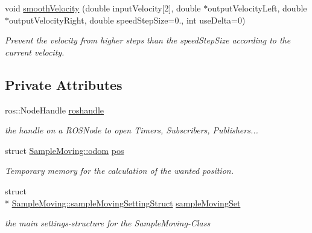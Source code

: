 \begin{DoxyCompactItemize}
void \hyperlink{classSampleMoving_ac7ba11bc1bd16a55bc217079d2f5b963}{smooth\-Velocity} (double input\-Velocity\mbox{[}2\mbox{]}, double $\ast$output\-Velocity\-Left, double $\ast$output\-Velocity\-Right, double speed\-Step\-Size=0., int use\-Delta=0)
\begin{DoxyCompactList}\small\item\em Prevent the velocity from higher steps than the speed\-Step\-Size according to the current velocity. \end{DoxyCompactList}\end{DoxyCompactItemize}
\subsection*{Private Attributes}
\begin{DoxyCompactItemize}
\item 
ros\-::\-Node\-Handle \hyperlink{classSampleMoving_aea05328d2394f244adba6fa37e3912d9}{roshandle}
\begin{DoxyCompactList}\small\item\em the handle on a R\-O\-S\-Node to open Timers, Subscribers, Publishers... \end{DoxyCompactList}\item 
\hypertarget{classSampleMoving_ab1781f18e06dc454ff2d65073f48e630}{struct \hyperlink{structSampleMoving_1_1odom}{Sample\-Moving\-::odom} \hyperlink{classSampleMoving_ab1781f18e06dc454ff2d65073f48e630}{pos}}\label{classSampleMoving_ab1781f18e06dc454ff2d65073f48e630}

\begin{DoxyCompactList}\small\item\em Temporary memory for the calculation of the wanted position. \end{DoxyCompactList}\item 
\hypertarget{classSampleMoving_af9c7dc0be1c4197469fbfa7aa105f1cc}{struct \\*
\hyperlink{structSampleMoving_1_1sampleMovingSettingStruct}{Sample\-Moving\-::sample\-Moving\-Setting\-Struct} \hyperlink{classSampleMoving_af9c7dc0be1c4197469fbfa7aa105f1cc}{sample\-Moving\-Set}}\label{classSampleMoving_af9c7dc0be1c4197469fbfa7aa105f1cc}

\begin{DoxyCompactList}\small\item\em the main settings-\/structure for the Sample\-Moving-\/\-Class \end{DoxyCompactList}\end{DoxyCompactItemize}


